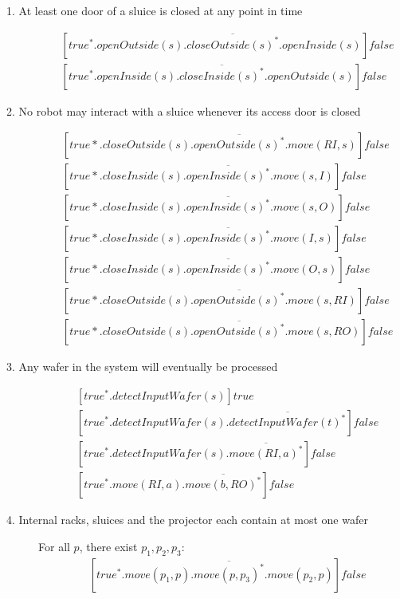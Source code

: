 
\begin{description}
 \item[1. At least one door of a sluice is closed at any point in time]
	\begin{align*}
		&[true^*.openOutside(s).\overline{closeOutside(s)^*}.openInside(s)]false \\
		&[true^*.openInside(s).\overline{closeInside(s)^*}.openOutside(s)]false
	\end{align*}

 \item[2. No robot may interact with a sluice whenever its access door is closed]
	\begin{align*}
		&[true*.closeOutside(s).\overline{openOutside(s)^*}.move(RI,s)]false \\
		&[true*.closeInside(s).\overline{openInside(s)^*}.move(s,I)]false \\
		&[true*.closeInside(s).\overline{openInside(s)^*}.move(s,O)]false \\
		&[true*.closeInside(s).\overline{openInside(s)^*}.move(I,s)]false \\
		&[true*.closeInside(s).\overline{openInside(s)^*}.move(O,s)]false \\
		&[true*.closeOutside(s).\overline{openOutside(s)^*}.move(s,RI)]false \\
		&[true*.closeOutside(s).\overline{openOutside(s)^*}.move(s,RO)]false
	\end{align*}
 
 \item[3. Any wafer in the system will eventually be processed]

	\begin{align*}
		&[true^*.detectInputWafer(s)]true\\
		&[true^*.detectInputWafer(s).\overline{detectInputWafer(t)^*}]false\\
		&[true^*.detectInputWafer(s).\overline{move(RI, a)^*}]false\\
		&[true^*.move(RI, a).\overline{move(b,RO)^*}]false
	\end{align*}

 
 \item[4. Internal racks, sluices and the projector each contain at most one wafer]
    
    For all $p$, there exist $p_1, p_2, p_3$:
	\begin{align*}
		&[true^*.move(p_1, p).\overline{move(p,p_3)^*}.move(p_2,p)]false
	\end{align*}


\end{description}
